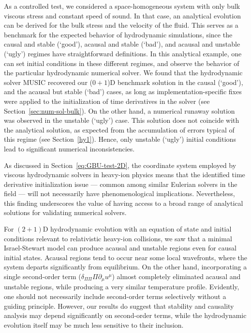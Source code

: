 \documentclass[aps, prd, showkeys,superscriptaddress, nofootinbib,floatfix]{revtex4-2}
\begin{document}
 As a controlled test, we considered a space-homogeneous system with only bulk viscous stress and constant speed of sound. In that case, an analytical evolution can be derived for the bulk stress and the velocity of the fluid. This serves as a benchmark for the expected behavior of hydrodynamic simulations, since the causal and stable (`good'), acausal and stable (`bad'), and acausal and unstable (`ugly') regimes have straightforward definitions. In this analytical example, one can set initial conditions in these different regimes, and observe the behavior of the particular hydrodynamic numerical solver.
We found that the hydrodynamic solver MUSIC recovered our ($0+1$)D  benchmark solution in the causal (`good'), and the acausal but stable (`bad') cases, as long as implementation-specific fixes were applied to the initialization of time derivatives in the solver (see Section~\ref{sec:num-sol-bulk}).   
On the other hand, a numerical runaway solution was observed in the unstable (`ugly') case. This solution does not coincide with the analytical solution, as expected from the accumulation of errors typical of this regime (see Section~\ref{hy1}). Hence, only unstable (`ugly') initial conditions lead to significant numerical inconsistencies. 

As discussed in Section~\ref{eq:GBU-test-2D}, the coordinate system employed by viscous hydrodynamic solvers in heavy-ion physics means that the identified time derivative initialization issue --- common among similar Eulerian solvers in the field --- will not necessarily have phenomenological implications. Nevertheless, this finding underscores the value of having access to a broad range of analytical solutions for validating numerical solvers.

For $(2+1)$D hydrodynamic evolution with an equation of state and initial conditions relevant to relativistic heavy-ion collisions, 
we saw that a minimal Israel-Stewart model can produce acausal and unstable regions even for causal initial states. Acausal regions tend to occur near some local wavefronts, where the system departs significantly from equilibrium. 
On the other hand, incorporating a single second-order term ($\delta_{\Pi \Pi} \Pi \partial_\mu u^\mu $) almost completely eliminated acausal and unstable regions, while producing a very similar temperature profile. Evidently, one should not necessarily include second-order terms selectively without a guiding principle. However, our results do suggest that stability and causality analysis may depend significantly on second-order terms, while the hydrodynamic evolution itself may be much less sensitive to their inclusion.
\end{document}

